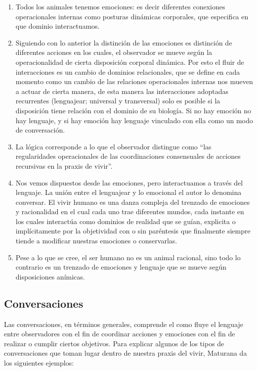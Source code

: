 \documentclass[10pt]{article}
\begin{document}
        \begin{enumerate}
            \item Todos los animales tenemos emociones: es decir diferentes conexiones operacionales internas como posturas dinámicas corporales, que especifica en que dominio interactuamos.
            \item Siguiendo con lo anterior la distinción de las emociones es distinción de diferentes acciones en los cuales, el observador se mueve según la operacionalidad de cierta disposición corporal dinámica. Por esto el fluir de interacciones es un cambio de dominios relacionales, que se define en cada momento como un cambio de las relaciones operacionales internas nos mueven a actuar de cierta manera, de esta manera las interacciones adoptadas recurrentes (lenguajear; universal y transversal) solo es posible si la disposición tiene relación con el dominio de su biología. Si no hay emoción no hay lenguaje, y si hay emoción hay lenguaje vinculado con ella como un modo de conversación.
            \item La lógica corresponde a lo que el observador distingue como “las regularidades operacionales de las coordinaciones consensuales de acciones recursivas en la praxis de vivir”.
            \item Nos vemos dispuestos desde las emociones, pero interactuamos a través del lenguaje. La unión entre el lenguajear y lo emocional el autor lo denomina conversar. El vivir humano es una danza compleja del trenzado de emociones y racionalidad en el cual cada uno trae diferentes mundos, cada instante en los cuales interactúa como dominios de realidad que se guían, explicita o implícitamente por la objetividad con o sin paréntesis que finalmente siempre tiende a modificar nuestras emociones o conservarlas.
            \item Pese a lo que se cree, el ser humano no es un animal racional, sino todo lo contrario es un trenzado de emociones y lenguaje que se mueve según disposiciones anímicas.
        
        \end{enumerate}

        \subsection{Conversaciones}

        Las conversaciones, en términos generales, comprende el como fluye el lenguaje entre observadores con el fin de coordinar acciones y emociones con el fin de realizar o cumplir ciertos objetivos. Para explicar algunos de los tipos de conversaciones que toman lugar dentro de nuestra praxis del vivir, Maturana da los siguientes ejemplos:
\end{document}
